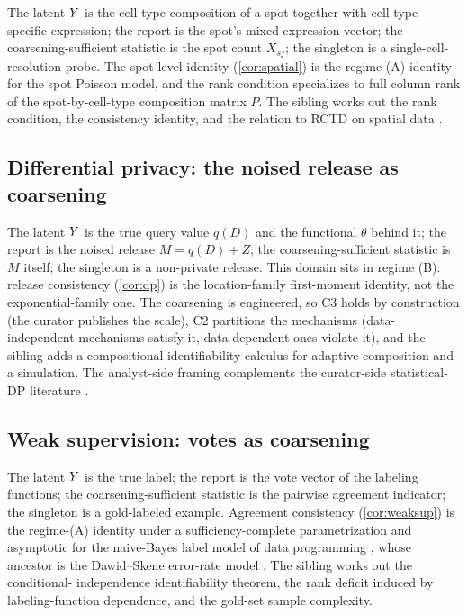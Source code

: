 The latent $Y$ is the cell-type composition of a spot together with
cell-type-specific expression; the report is the spot's mixed
expression vector; the coarsening-sufficient statistic is the spot
count $X_{sj}$; the singleton is a single-cell-resolution probe. The
spot-level identity (\cref{cor:spatial}) is the regime-(A) identity for
the spot Poisson model, and the rank condition specializes to full
column rank of the spot-by-cell-type composition matrix $P$. The
sibling \citep{towell2026spatialcoarsening} works out the rank
condition, the consistency identity, and the relation to RCTD
\citep{cable2021robust} on spatial data \citep{stahl2016visualization}.

\subsection{Differential privacy: the noised release as coarsening}

The latent $Y$ is the true query value $q(D)$ and the functional
$\theta$ behind it; the report is the noised release $M = q(D) + Z$;
the coarsening-sufficient statistic is $M$ itself; the singleton is a
non-private release. This domain sits in regime (B): release
consistency (\cref{cor:dp}) is the location-family first-moment
identity, not the exponential-family one. The coarsening is engineered,
so C3 holds by construction (the curator publishes the scale), C2
partitions the mechanisms (data-independent mechanisms satisfy it,
data-dependent ones violate it), and the sibling
\citep{towell2026dpcoarsening} adds a compositional identifiability
calculus for adaptive composition and a simulation. The
analyst-side framing complements the curator-side statistical-DP
literature \citep{wasserman2010statistical,dwork2014algorithmic}.

\subsection{Weak supervision: votes as coarsening}

The latent $Y$ is the true label; the report is the vote vector of the
labeling functions; the coarsening-sufficient statistic is the pairwise
agreement indicator; the singleton is a gold-labeled example. Agreement
consistency (\cref{cor:weaksup}) is the regime-(A) identity under a
sufficiency-complete parametrization and asymptotic for the naive-Bayes
label model of data programming \citep{ratner2016data}, whose ancestor
is the Dawid--Skene error-rate model \citep{dawid1979maximum}. The
sibling \citep{towell2026weaksupcoarsening} works out the conditional-
independence identifiability theorem, the rank deficit induced by
labeling-function dependence, and the gold-set sample complexity.

